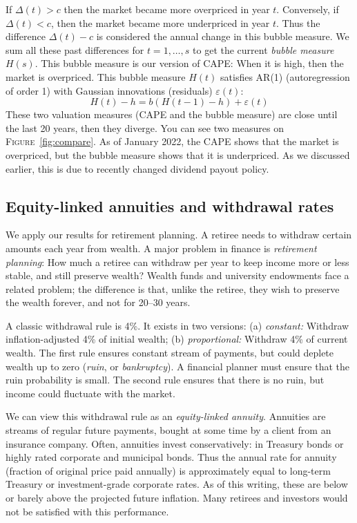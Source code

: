 \documentclass[12pt]{amsart}
\theoremstyle{definition}
\begin{document}
If $\Delta(t) > c$ then the market became more overpriced in year $t$. Conversely, if $\Delta(t) < c$, then the market became more underpriced in year $t$. Thus the difference $\Delta(t) - c$ is considered the annual change in this bubble measure. We sum all these past differences for $t = 1, \ldots, s$ to get the current {\it bubble measure} $H(s)$. This bubble measure is our version of CAPE: When it is high, then the market is overpriced.  This bubble measure $H(t)$ satisfies AR(1) (autoregression of order 1) with Gaussian innovations (residuals) $\varepsilon(t)$:
\begin{equation}
\label{eq:ar-initial}
H(t) - h = b(H(t-1) - h) + \varepsilon(t)
\end{equation}
These two valuation measures (CAPE and the bubble measure) are close until the last 20 years, then they diverge. You can see two measures on \textsc{Figure}~\ref{fig:compare}. As of January 2022, the CAPE shows that the market is overpriced, but the bubble measure shows that it is underpriced. As we discussed earlier, this is due to recently changed dividend payout policy.

\subsection{Equity-linked annuities and withdrawal rates} We apply our results for retirement planning. A retiree needs to withdraw certain amounts each year from wealth. A major problem in finance is {\it retirement planning}: How much a retiree can withdraw per year to keep income more or less stable, and still preserve wealth? Wealth funds and university endowments face a related problem; the difference is that, unlike the retiree, they wish to preserve the wealth forever, and not for 20--30 years. 

A classic withdrawal rule is 4\%. It exists in two versions: (a) {\it constant:} Withdraw inflation-adjusted 4\% of initial wealth; (b) {\it proportional:} Withdraw 4\% of current wealth. The first rule ensures constant stream of payments, but could deplete wealth up to zero ({\it ruin}, or {\it bankruptcy}). A financial planner must ensure that the ruin probability is small. The second rule ensures that there is no ruin, but income could fluctuate with the market. 

We can view this withdrawal rule as an {\it equity-linked annuity}. Annuities are streams of regular future payments, bought at some time by a client from an insurance company. Often, annuities invest conservatively: in Treasury bonds or highly rated corporate and municipal bonds. Thus the annual rate for annuity (fraction of original price paid annually) is approximately equal to long-term Treasury or investment-grade corporate rates. As of this writing, these are below or barely above the projected future inflation. Many retirees and investors would not be satisfied with this performance. 
\end{document}
